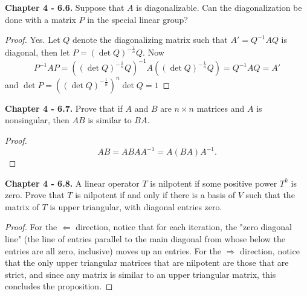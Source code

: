 \documentclass[10pt]{report}
\theoremstyle{definition}
\begin{document}
\textbf{Chapter 4 - 6.6.} Suppose that $A$ is diagonalizable. Can the diagonalization be done with a matrix $P$ in the special linear group?
\begin{proof}
Yes. Let $Q$ denote the diagonalizing matrix such that $A'=Q^{-1}AQ$ is diagonal, then let $P=(\det Q)^{-\frac{1}{n}}Q$. Now $$P^{-1}AP=((\det Q)^{-\frac{1}{n}}Q)^{-1}A((\det Q)^{-\frac{1}{n}}Q)=Q^{-1}AQ=A'$$ and $\det P=((\det Q)^{-\frac{1}{n}})^n\det Q=1$
\end{proof}

\textbf{Chapter 4 - 6.7.} Prove that if $A$ and $B$ are $n \times n$ matrices and $A$ is nonsingular, then $A B$ is similar to $B A .$
\begin{proof}
$$AB=ABAA^{-1}=A(BA)A^{-1}.$$
\end{proof}

\textbf{Chapter 4 - 6.8.} A linear operator $T$ is nilpotent if some positive power $T^{k}$ is zero. Prove that $T$ is nilpotent if and only if there is a basis of $V$ such that the matrix of $T$ is upper triangular, with diagonal entries zero.
\begin{proof}
For the $\Leftarrow$ direction, notice that for each iteration, the "zero diagonal line" (the line of entries parallel to the main diagonal from whose below the entries are all zero, inclusive) moves up an entries. For the $\Rightarrow$ direction, notice that the only upper triangular matrices that are nilpotent are those that are strict, and since any matrix is similar to an upper triangular matrix, this concludes the proposition.
\end{proof}
\end{document}
